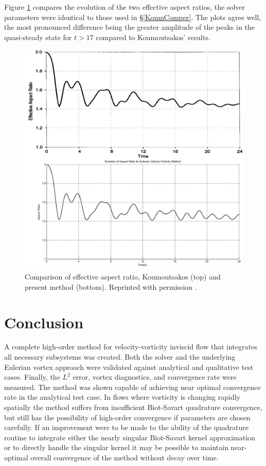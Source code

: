 \documentclass[]{aiaa-tc}%
\begin{document}
Figure \ref{fig:AspectRatio} compares the evolution of the two effective aspect ratios, the solver parameters were identical to those used in \S\ref{KoumComper}. The plots agree well, the most pronounced difference being the greater amplitude of the peaks in the quasi-steady state for $t>17$ compared to Koumoutsakos' results.
\begin{figure}
\centering
\includegraphics[width=1\textwidth]{AspectRatio.PNG}
\caption{\label{fig:AspectRatio}Comparison of effective aspect ratio, Koumoutsakos \cite{Koum1997} (top) and present method (bottom). Reprinted with permission \cite{KoumLic}.}
\end{figure}

\section{Conclusion}

A complete high-order method for velocity-vorticity inviscid flow that integrates all necessary subsystems was created. Both the solver and the underlying Eulerian vortex approach were validated against analytical and qualitative test cases. Finally, the $L^2$ error, vortex diagnostics, and convergence rate were measured. The method was shown capable of achieving near optimal convergence rate in the analytical test case. In flows where vorticity is changing rapidly spatially the method suffers from insufficient Biot-Savart quadrature convergence, but still has the possibility of high-order convergence if parameters are chosen carefully. If an improvement were to be made to the ability of the quadrature routine to integrate either the nearly singular Biot-Savart kernel approximation or to directly handle the singular kernel it may be possible to maintain near-optimal overall convergence of the method without decay over time.
\end{document}
